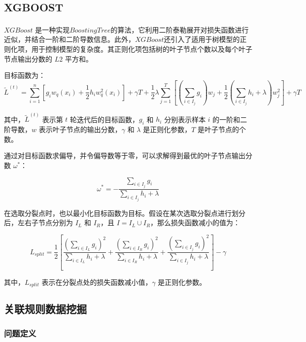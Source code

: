 \documentclass[withoutpreface,bwprint]{cumcmthesis}
\begin{document}
\subsection{XGBOOST}

\(XGBoost\) \textsuperscript{\cite{sharma2024xgboost}}是一种实现\(Boosting Tree\)的算法，它利用二阶泰勒展开对损失函数进行近似，并结合一阶和二阶导数信息。此外，\(XGBoost\)还引入了适用于树模型的正则化项，用于控制模型的复杂度。其正则化项包括树的叶子节点个数以及每个叶子节点输出分数的 \(L2\) 平方和。

目标函数为：
\[
\tilde{L}^{(t)} = \sum^n_{i=1} \left[ g_i w_q(x_i) + \frac{1}{2} h_i w_q^2(x_i) \right] + \gamma T + \frac{1}{2} \lambda \sum^T_{j=1} \left[ \left( \sum_{i\in I_j} g_i \right) w_j + \frac{1}{2} \left( \sum_{i\in I_j} h_i + \lambda \right) w_j^2 \right] + \gamma T
\]

其中，\( \tilde{L}^{(t)} \) 表示第 \( t \) 轮迭代后的目标函数，\( g_i \) 和 \( h_i \) 分别表示样本 \( i \) 的一阶和二阶导数，\( w \) 表示叶子节点的输出分数，\( \gamma \) 和 \( \lambda \) 是正则化参数，\( T \) 是叶子节点的个数。

通过对目标函数求偏导，并令偏导数等于零，可以求解得到最优的叶子节点输出分数 \( \omega^* \)：

\[
\omega^* = -\frac{\sum_{i\in I_j} g_i}{\sum_{i\in I_j} h_i + \lambda}
\]

在选取分裂点时，也以最小化目标函数为目标。假设在某次选取分裂点进行划分后，左右子节点分别为 \( I_L \) 和 \( I_R \)，且 \( I = I_L \cup I_R \)，那么损失函数减小的值为：

\[
L_{split} = \frac{1}{2} \left[ \frac{\left( \sum_{i\in I_L} g_i \right)^2}{\sum_{i\in I_L} h_i + \lambda} + \frac{\left( \sum_{i\in I_R} g_i \right)^2}{\sum_{i\in I_R} h_i + \lambda} + \frac{\left( \sum_{i\in I_j} g_i \right)^2}{\sum_{i\in I_j} h_i + \lambda} \right] - \gamma
\]

其中，\( L_{split} \) 表示在分裂点处的损失函数减小值，\( \gamma \) 是正则化参数。


\subsection{关联规则数据挖掘}

\subsubsection{问题定义}
\end{document}
